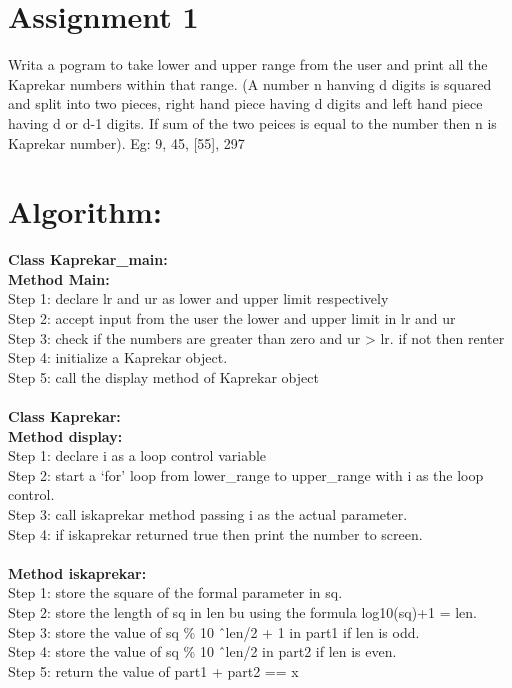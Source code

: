 \section*{\centering Assignment 1}
\vspace{15px}
Writa a pogram to take lower and upper range from the user and print all the Kaprekar numbers
within that range. (A number n hanving d digits is squared and split into two pieces, 
right hand piece having d digits and left hand piece having d or d-1 digits. If sum of the two peices is
equal to the number then n is Kaprekar number). Eg: 9, 45, [55], 297

\section*{Algorithm:}
\textbf{\color{javapurple}Class Kaprekar\_main:}\\
\textbf{Method Main:}\\
Step 1: declare lr and ur as lower and upper limit respectively\\
Step 2: accept input from the user the lower and upper limit in lr and ur\\
Step 3: check if the numbers are greater than zero and ur > lr. if not then renter\\
Step 4: initialize a Kaprekar object.\\
Step 5: call the display method of Kaprekar object\\\\
\textbf{\color{javapurple}Class Kaprekar:}\\
\textbf{Method display:}\\
Step 1: declare i as a loop control variable \\
Step 2: start a `for' loop from lower\_range to upper\_range with i as the loop control.\\
Step 3: call iskaprekar method passing i as the actual parameter. \\
Step 4: if iskaprekar returned true then print the number to screen. \\\\
\textbf{Method iskaprekar:}\\
Step 1: store the square of the formal parameter in sq. \\
Step 2: store the length of sq in len bu using the formula log10(sq)+1 = len. \\
Step 3: store the value of sq \% 10 \^\ len/2 + 1 in part1 if len is odd. \\  
Step 4: store the value of sq \% 10 \^\ len/2 in part2 if len is even. \\  
Step 5: return the value of part1 + part2 == x\\

